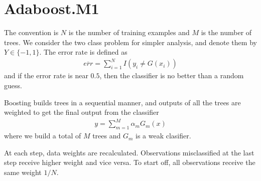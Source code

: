 \documentclass[../statistical_learning_notes.tex]{subfiles}
\begin{document}
    \section{Adaboost.M1}\label{sec:adaboost_m1}
    The convention is $N$ is the number of training examples and $M$ is the number of trees.\newline
    We consider the two class problem for simpler analysis, and denote them by $Y \in \{-1, 1 \}$. The error rate is defined as
    \begin{align*}
        \overline{err} = \sum_{i=1}^{N} I(y_{i} \neq G(x_{i}))
    \end{align*}
    and if the error rate is near $0.5$, then the classifier is no better than a random guess.\newline

    Boosting builds trees in a sequential manner, and outputs of all the trees are weighted to get the final output from the classifier
    \begin{align*}
         y = \sum_{m=1}^{M} \alpha_{m}G_{m}(x)
    \end{align*}
    where we build a total of $M$ trees and $G_{m}$ is a weak clasifier.\newline

    At each step, data weights are recalculated. Observations misclassified at the last step receive higher weight and vice versa. To start off, all observations receive the same weight $1/N$.

\end{document}
